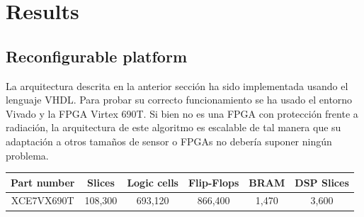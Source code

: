 \cleardoublepage
\chapter{Results}
\label{makereference}
\section{Reconfigurable platform}
La arquitectura descrita en la anterior sección ha sido implementada usando el lenguaje VHDL. Para probar su correcto funcionamiento se ha usado el entorno Vivado y la FPGA Virtex 690T. Si bien no es una FPGA con protección frente a radiación, la arquitectura de este algoritmo es escalable de tal manera que su adaptación a otros tamaños de sensor o FPGAs no debería suponer ningún problema.

\begin{center}
 \begin{tabular}{|c|c|c|c|c|c|} 
 \hline
 Part number & Slices & Logic cells & Flip-Flops & BRAM & DSP Slices \\
 \hline
 XCE7VX690T & 108,300 & 693,120 & 866,400 & 1,470 & 3,600\\
 \hline
\end{tabular}
\end{center}

